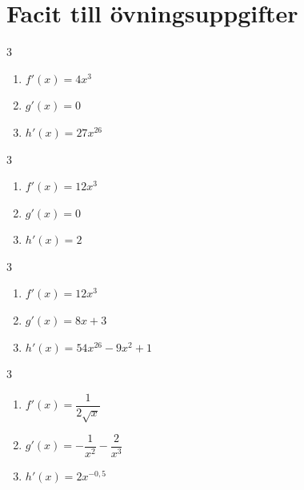 \documentclass[a4paper, 12pt]{article}
\begin{document}
\newpage
\section{Facit till övningsuppgifter}

\begin{facit}
    \begin{multicols}{3}
        \begin{enumerate}
            \item $f'(x) = 4x^3$
            \item $g'(x) = 0$
            \item $h'(x) = 27x^{26}$
        \end{enumerate}
    \end{multicols}
\end{facit}

\begin{facit}
    \begin{multicols}{3}
        \begin{enumerate}
            \item $f'(x) = 12x^3$
            \item $g'(x) = 0$
            \item $h'(x) = 2$
        \end{enumerate}
    \end{multicols}
\end{facit}

\begin{facit}
    \begin{multicols}{3}
        \begin{enumerate}
            \item $f'(x) = 12x^3$
            \item $g'(x) = 8x + 3$
            \item $h'(x) = 54x^{26} - 9x^2 + 1$
        \end{enumerate}
    \end{multicols}
\end{facit}

\begin{facit}
    \begin{multicols}{3}
        \begin{enumerate}
            \item $f'(x) = \dfrac 1{2\sqrt{x}}$
            \item $g'(x) = -\dfrac 1{x^2} - \dfrac 2 {x^3}$
            \item $h'(x) = 2x^{-0,5}$
        \end{enumerate}
    \end{multicols}
\end{facit}
\end{document}
